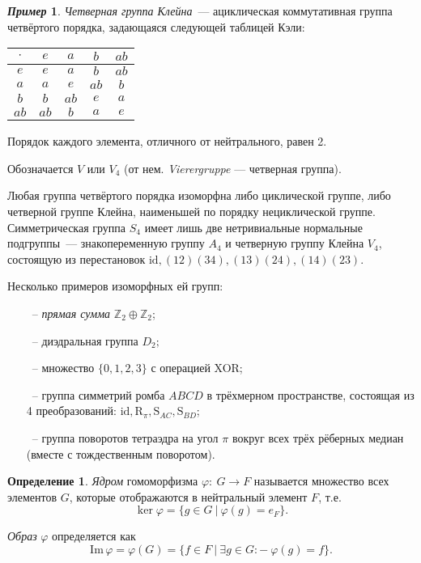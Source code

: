 \documentclass[a4paper, 14pt]{extarticle}
\newcommand{\n}{\par}
\newcommand{\integers}{\mathbb{Z}}
\newcommand{\suchthat}{{:}{-} \ }
\newcommand{\im}{\mathrm{Im} \,}
\newcommand{\id}{\mathrm{id}}
\newcommand{\Rot}{\mathrm{R}}
\newcommand{\Sym}{\mathrm{S}}
\renewcommand{\phi}{\varphi}
\theoremstyle{definition}
\newtheorem*{exmpl*}{\textit{Пример}}
\newtheorem{definition}{Определение}
\theoremstyle{plain}
\numberwithin{theorem}{section}
\numberwithin{definition}{section}
\numberwithin{statement}{section}
\numberwithin{lemma}{section}
\numberwithin{consequence}{section}
\begin{document}
		\newpage
		\begin{exmpl*}
			\textit{Четверная группа Клейна}~--- ациклическая коммутативная группа четвёртого порядка, задающаяся следующей таблицей Кэли: \n

			\begin{center}
				\begin{tabular}{c |c c c c}
					$\cdot$ & $e$ & $a$ & $b$ & $ab$\\
					\hline
					$e$ & $e$ & $a$ & $b$ & $ab$\\
					
					$a$ & $a$ & $e$ & $ab$ & $b$\\
					
					$b$ & $b$ & $ab$ & $e$ & $a$\\
					
					$ab$ & $ab$ & $b$ & $a$ & $e$\\
				\end{tabular}
			\end{center} \n
			Порядок каждого элемента, отличного от нейтрального, равен 2. \n
			Обозначается $V$ или $V_4$ (от нем. \textit{Vierergruppe} — четверная группа). \n
			Любая группа четвёртого порядка изоморфна либо циклической группе, либо четверной группе Клейна, наименьшей по порядку нециклической группе. Симметрическая группа $S_4$ имеет лишь две нетривиальные нормальные подгруппы~--- знакопеременную группу $A_4$ и четверную группу Клейна $V_4$, состоящую из перестановок ${\mathrm{id}, (12)(34), (13)(24), (14)(23).}$ \n
			Несколько примеров изоморфных ей групп:
			\begin{itemize}
				\setlength\itemsep{0.1em}
				\item[~--] \textit{прямая сумма} $\integers_2 \oplus \integers_2$;
				\item[~--] диэдральная группа $D_2;$
				\item[~--] множество ${\{0, 1, 2, 3\}}$ с операцией XOR;
				\item[~--] группа симметрий ромба $ABCD$ в трёхмерном пространстве, состоящая из 4 преобразований: ${\id, \Rot_\pi, \Sym_{AC}, \Sym_{BD}}$;
				\item[~--] группа поворотов тетраэдра на угол $\pi$ вокруг всех трёх рёберных медиан (вместе с тождественным поворотом).
			\end{itemize}
		\end{exmpl*}
		\newpage
		\begin{definition}
			\textit{Ядром} гомоморфизма ${\phi{:} \ G \rightarrow F}$ называется множество всех элементов $G$, которые отображаются в нейтральный элемент $F$, т.е.
			\begin{equation*}
				\ker \phi = \{g \in G \ | \ \phi(g) = e_F\}.
			\end{equation*} \n
			\textit{Образ} $\phi$ определяется как
			\begin{equation*}
				\im \phi = \phi(G) = \{f \in F \ | \ \exists g \in G \suchthat \phi(g) = f\}.
			\end{equation*}
		\end{definition}
\end{document}
